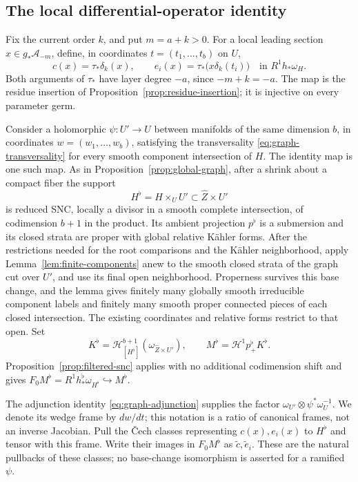 \subsection{The local differential-operator identity}

Fix the current order \(k\), and put \(m=a+k>0\).  For a local leading
section \(x\in g_*\mathcal A_{-m}\), define, in coordinates
\(t=(t_1,\ldots,t_b)\) on \(U\),
\begin{equation}\label{eq:residue-obstructions}
 c(x)=\tau_*\delta_k(x),\qquad
 e_i(x)=\tau_*\bigl(x\delta_k(t_i)\bigr)
 \quad\text{in }R^1h_*\omega_H.
\end{equation}
Both arguments of \(\tau_*\) have layer degree \(-a\), since
\(-m+k=-a\).  The map is the residue insertion of
Proposition~\ref{prop:residue-insertion}; it is injective on every
parameter germ.

Consider a holomorphic \(\psi:U'\to U\) between manifolds of the same
dimension \(b\), in coordinates \(w=(w_1,\ldots,w_b)\), satisfying
the transversality \eqref{eq:graph-transversality} for every smooth
component intersection of \(H\).  The identity map is one such map.
As in Proposition~\ref{prop:global-graph}, after a shrink about a compact
fiber the support
\[
 H^\flat=H\times_U U'\subset\widehat Z\times U'
\]
is reduced SNC, locally a divisor in a smooth complete intersection,
of codimension \(b+1\) in the product.  Its ambient projection
\(p^\flat\) is a submersion and its closed strata are proper with global
relative K\"ahler forms.  After the restrictions needed for the root
comparisons and the K\"ahler neighborhood, apply
Lemma~\ref{lem:finite-components} anew to the smooth closed strata of
the graph cut over \(U'\), and use its final open neighborhood.  Properness
survives this base change, and the lemma gives finitely many globally
smooth irreducible component labels and finitely many smooth proper
connected pieces of each closed intersection.  The existing coordinates
and relative forms restrict to that open.  Set
\[
 K^\flat=\mathcal H^{b+1}_{[H^\flat]}(\omega_{\widehat Z\times U'}),
 \qquad M^\flat=\mathcal H^1p^\flat_+K^\flat.
\]
Proposition~\ref{prop:filtered-snc} applies with no additional
codimension shift and gives
\(F_0M^\flat=R^1h^\flat_*\omega_{H^\flat}\hookrightarrow M^\flat\).

The adjunction identity \eqref{eq:graph-adjunction} supplies the factor
\(\omega_{U'}\otimes\psi^*\omega_U^{-1}\).  We denote its wedge frame
by \(dw/dt\); this notation is a ratio of canonical frames, not an
inverse Jacobian.  Pull the \v Cech classes representing \(c(x),e_i(x)\)
to \(H^\flat\) and tensor with this frame.  Write their images in
\(F_0M^\flat\) as \(\widetilde c,\widetilde e_i\).  These are the natural
pullbacks of these classes; no base-change isomorphism is asserted for
a ramified \(\psi\).

